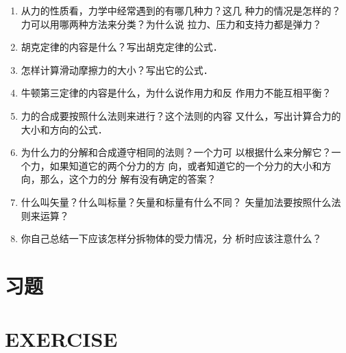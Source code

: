 \begin{enumerate}
\item 从力的性质看，力学中经常遇到的有哪几种力？这几
种力的情况是怎样的？力可以用哪两种方法来分类？为什么说
拉力、压力和支持力都是弹力？
\item
胡克定律的内容是什么？写出胡克定律的公式．
\item
怎样计算滑动摩擦力的大小？写出它的公式．
\item 牛顿第三定律的内容是什么，为什么说作用力和反
作用力不能互相平衡？
\item
力的合成要按照什么法则来进行？这个法则的内容
又什么，写出计算合力的大小和方向的公式．
\item
为什么力的分解和合成遵守相同的法则？一个力可
以根据什么来分解它？一个力，如果知道它的两个分力的方
向，或者知道它的一个分力的大小和方向，那么，这个力的分
解有没有确定的答案？
\item
什么叫矢量？什么叫标量？矢量和标量有什么不同？
矢量加法要按照什么法则来运算？
\item
你自己总结一下应该怎样分拆物体的受力情况，分
析时应该注意什么？
\end{enumerate}

\section*{习题}
\lipsum[2]

\section*{EXERCISE}

\lipsum[2]

